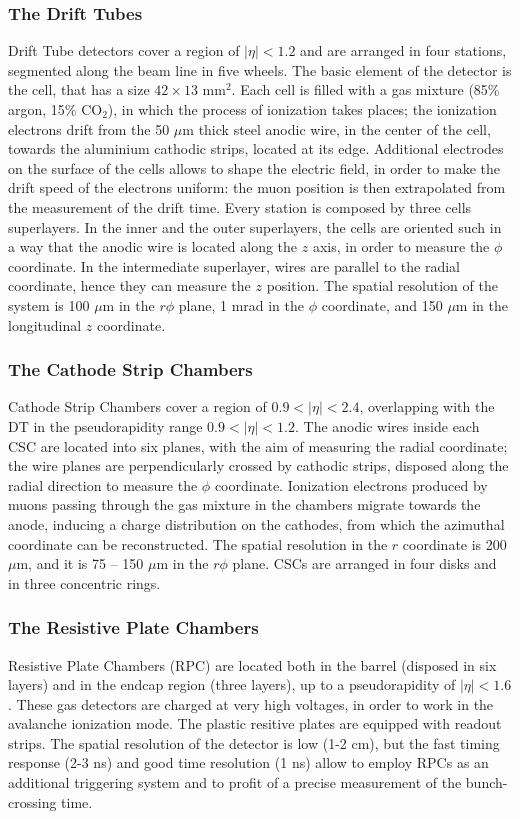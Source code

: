 \subsubsection{The Drift Tubes}
Drift Tube detectors cover a region of $|\eta|<1.2$ and are arranged in four stations, segmented along the beam line in five wheels. The basic element of the detector is the cell, that has a size $42 \times 13 \text{ mm}^2$. Each cell is filled with a gas mixture (85\% argon, 15\% $\text{CO}_2$), in which the process of ionization takes places; the ionization electrons drift from the 50 $\mu$m thick steel anodic wire, in the center of the cell, towards the aluminium cathodic strips, located at its edge. Additional electrodes on the surface of the cells allows to shape the electric field, in order to make the drift speed of the electrons uniform: the muon position is then extrapolated from the measurement of the drift time. Every station is composed by three cells superlayers. In the inner and the outer superlayers, the cells are oriented such in a way that the anodic wire is located along the $z$ axis, in order to measure the $\phi$ coordinate. In the intermediate superlayer, wires are parallel to the radial coordinate, hence they can measure the $z$ position. The spatial resolution of the system is 100 $\mu$m in the $r \phi$ plane, 1 mrad in the $\phi$ coordinate, and 150 $\mu$m in the longitudinal $z$ coordinate.

\subsubsection{The Cathode Strip Chambers}
Cathode Strip Chambers cover a region of $0.9<|\eta|<2.4$, overlapping with the DT in the pseudorapidity range $0.9 < |\eta| < 1.2$. The anodic wires inside each CSC are located into six planes, with the aim of measuring the radial coordinate; the wire planes are perpendicularly crossed by cathodic strips, disposed along the radial direction to measure the $\phi$ coordinate. Ionization electrons produced by muons passing through the gas mixture in the chambers migrate towards the anode, inducing a charge distribution on the cathodes, from which the azimuthal coordinate can be reconstructed. The spatial resolution in the $r$ coordinate is 200 $\mu$m, and it is 75 -- 150 $\mu$m in the $r \phi$ plane. CSCs are arranged in four disks and in three concentric rings.

\subsubsection{The Resistive Plate Chambers}
Resistive Plate Chambers (RPC) are located both in the barrel (disposed in six layers) and in the endcap region (three layers), up to a pseudorapidity of $|\eta|<1.6$. These gas detectors are charged at very high voltages, in order to work in the avalanche ionization mode. The plastic resitive plates are equipped with readout strips. The spatial resolution of the detector is low (1-2 cm), but the fast timing response (2-3 ns) and good time resolution (1 ns) allow to employ RPCs as an additional triggering system and to profit of a precise measurement of the bunch-crossing time.

